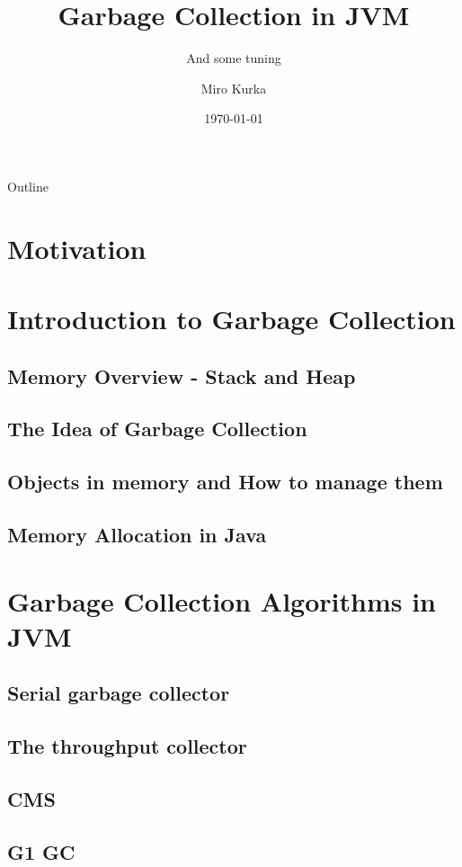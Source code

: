 \documentclass{beamer}
\title{Garbage Collection in JVM}
\subtitle{And some tuning}
\author{Miro Kurka}
\institute{Pavol Jozef Safarik University}
\date{\today}
\begin{document}
\begin{frame}
\titlepage
\end{frame}
\begin{frame}{Outline}
    \tableofcontents
\end{frame}
\section{Motivation}

\section{Introduction to Garbage Collection}
\subsection{Memory Overview - Stack and Heap}
\subsection{The Idea of Garbage Collection}
\subsection{Objects in memory and How to manage them}
\subsection{Memory Allocation in Java}

\section{Garbage Collection Algorithms in JVM}
    \subsection{Serial garbage collector}
    \subsection{The throughput collector}
    \subsection{CMS}
    \subsection{G1 GC}
    
\end{document}
